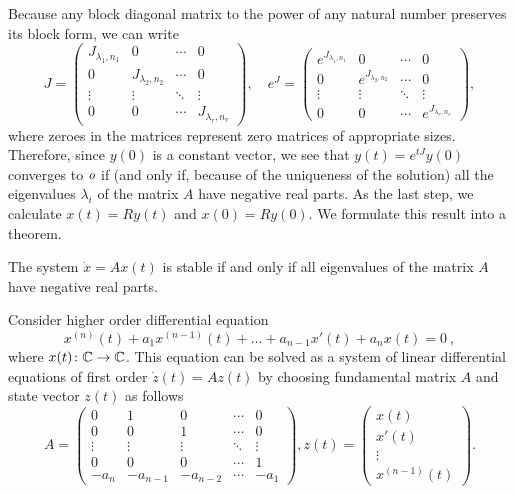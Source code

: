 Because any block diagonal matrix to the power of any natural number preserves its block form, we can write
\begin{equation*}
	J=
	\begin{pmatrix}
		J_{\lambda_1,n_1} & 0 & \cdots & 0 \\
		0 & J_{\lambda_2,n_2} & \cdots & 0 \\
		\vdots & \vdots & \ddots & \vdots \\
		0 & 0 & \cdots & J_{\lambda_r,n_r}
	\end{pmatrix},
	\quad 
	e^J=
	\begin{pmatrix}
		e^{J_{\lambda_1,n_1}} & 0 & \cdots & 0 \\
		0 & e^{J_{\lambda_2,n_2}} & \cdots & 0 \\
		\vdots & \vdots & \ddots & \vdots \\
		0 & 0 & \cdots & e^{J_{\lambda_r,n_r}}
	\end{pmatrix}
	,
\end{equation*}
where zeroes in the matrices represent zero matrices of appropriate sizes. Therefore, since $y(0)$ is a constant vector, we see that $y(t)=e^{tJ}y(0)$ converges to $\textit{o}$ if (and only if, because of the uniqueness of the solution) all the eigenvalues $\lambda_i$ of the matrix $A$ have negative real parts. As the last step, we calculate $x(t)=Ry(t)$ and $x(0)=Ry(0)$. We formulate this result into a theorem.

\begin{theorem}
	The system $\dot{x}=Ax(t)$ is stable if and only if all eigenvalues of the matrix $A$ have negative real parts.
\end{theorem}

\begin{example}
	Consider higher order differential equation $$x^{(n)}(t)+a_1x^{(n-1)}(t)+\ldots+a_{n-1}x'(t)+a_nx(t)=0\ ,$$ where $x(t)\colon\mathbb{C}\rightarrow\mathbb{C}$. This equation can be solved as a system of linear differential equations of first order $\dot{z}(t)=Az(t)$ by choosing fundamental matrix $A$ and state vector $z(t)$ as follows
	\begin{equation*}
		A=
		\begin{pmatrix}
			0 & 1 & 0 & \cdots & 0 \\
			0 & 0 & 1 & \cdots & 0 \\
			\vdots & \vdots & \vdots & \ddots & \vdots \\
			0 & 0 & 0 & \cdots & 1 \\
			-a_n & -a_{n-1} & -a_{n-2} & \cdots & -a_1
		\end{pmatrix}
		, z(t)=
		\begin{pmatrix}
			x(t) \\
			x'(t) \\
			\vdots \\
			x^{(n-1)}(t)
		\end{pmatrix}.
	\end{equation*}
\end{example}

